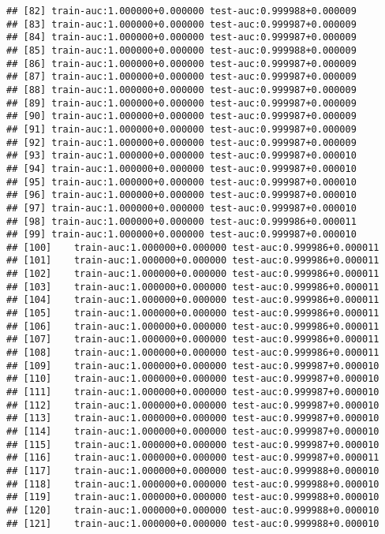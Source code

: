 \documentclass[11pt,]{article}
\begin{document}
\begin{verbatim}
## [82] train-auc:1.000000+0.000000 test-auc:0.999988+0.000009 
## [83] train-auc:1.000000+0.000000 test-auc:0.999987+0.000009 
## [84] train-auc:1.000000+0.000000 test-auc:0.999987+0.000009 
## [85] train-auc:1.000000+0.000000 test-auc:0.999988+0.000009 
## [86] train-auc:1.000000+0.000000 test-auc:0.999987+0.000009 
## [87] train-auc:1.000000+0.000000 test-auc:0.999987+0.000009 
## [88] train-auc:1.000000+0.000000 test-auc:0.999987+0.000009 
## [89] train-auc:1.000000+0.000000 test-auc:0.999987+0.000009 
## [90] train-auc:1.000000+0.000000 test-auc:0.999987+0.000009 
## [91] train-auc:1.000000+0.000000 test-auc:0.999987+0.000009 
## [92] train-auc:1.000000+0.000000 test-auc:0.999987+0.000009 
## [93] train-auc:1.000000+0.000000 test-auc:0.999987+0.000010 
## [94] train-auc:1.000000+0.000000 test-auc:0.999987+0.000010 
## [95] train-auc:1.000000+0.000000 test-auc:0.999987+0.000010 
## [96] train-auc:1.000000+0.000000 test-auc:0.999987+0.000010 
## [97] train-auc:1.000000+0.000000 test-auc:0.999987+0.000010 
## [98] train-auc:1.000000+0.000000 test-auc:0.999986+0.000011 
## [99] train-auc:1.000000+0.000000 test-auc:0.999987+0.000010 
## [100]    train-auc:1.000000+0.000000 test-auc:0.999986+0.000011 
## [101]    train-auc:1.000000+0.000000 test-auc:0.999986+0.000011 
## [102]    train-auc:1.000000+0.000000 test-auc:0.999986+0.000011 
## [103]    train-auc:1.000000+0.000000 test-auc:0.999986+0.000011 
## [104]    train-auc:1.000000+0.000000 test-auc:0.999986+0.000011 
## [105]    train-auc:1.000000+0.000000 test-auc:0.999986+0.000011 
## [106]    train-auc:1.000000+0.000000 test-auc:0.999986+0.000011 
## [107]    train-auc:1.000000+0.000000 test-auc:0.999986+0.000011 
## [108]    train-auc:1.000000+0.000000 test-auc:0.999986+0.000011 
## [109]    train-auc:1.000000+0.000000 test-auc:0.999987+0.000010 
## [110]    train-auc:1.000000+0.000000 test-auc:0.999987+0.000010 
## [111]    train-auc:1.000000+0.000000 test-auc:0.999987+0.000010 
## [112]    train-auc:1.000000+0.000000 test-auc:0.999987+0.000010 
## [113]    train-auc:1.000000+0.000000 test-auc:0.999987+0.000010 
## [114]    train-auc:1.000000+0.000000 test-auc:0.999987+0.000010 
## [115]    train-auc:1.000000+0.000000 test-auc:0.999987+0.000010 
## [116]    train-auc:1.000000+0.000000 test-auc:0.999987+0.000011 
## [117]    train-auc:1.000000+0.000000 test-auc:0.999988+0.000010 
## [118]    train-auc:1.000000+0.000000 test-auc:0.999988+0.000010 
## [119]    train-auc:1.000000+0.000000 test-auc:0.999988+0.000010 
## [120]    train-auc:1.000000+0.000000 test-auc:0.999988+0.000010 
## [121]    train-auc:1.000000+0.000000 test-auc:0.999988+0.000010 

\end{verbatim}
\end{document}
